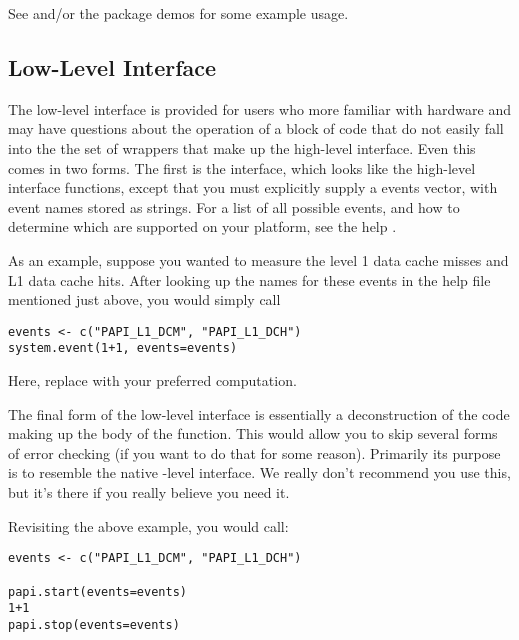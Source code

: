 See  and/or the package demos for some example usage.


\subsection{Low-Level Interface}

The low-level interface is provided for users who more familiar with hardware and may have 
questions about the operation of a block of code that do not easily fall into the the set of 
wrappers that make up the high-level interface.  Even this comes in two forms.  The first is the 
 interface, which looks like the high-level interface functions, except that 
you must explicitly supply a \PAPI events vector, with event names stored as strings.  For a list 
of all possible events, and how to determine which are supported on your platform, see the \R help 
.

As an example, suppose you wanted to measure the level 1 data cache misses and L1 data cache hits. 
After looking up the names for these events in the help file mentioned just above, you would simply 
call
\begin{lstlisting}[language=rr]
events <- c("PAPI_L1_DCM", "PAPI_L1_DCH")
system.event(1+1, events=events)
\end{lstlisting}

Here, replace  with your preferred computation.

The final form of the low-level interface is essentially a deconstruction of the code making up the 
body of the  function.  This would allow you to skip several forms of error 
checking (if you want to do that for some reason).  Primarily its purpose is to resemble the 
native \C-level \PAPI interface.  We really don't recommend you use this, but it's there if you 
really believe you need it.

Revisiting the above example, you would call:
\begin{lstlisting}[language=rr]
events <- c("PAPI_L1_DCM", "PAPI_L1_DCH")

papi.start(events=events)
1+1
papi.stop(events=events)
\end{lstlisting}


\